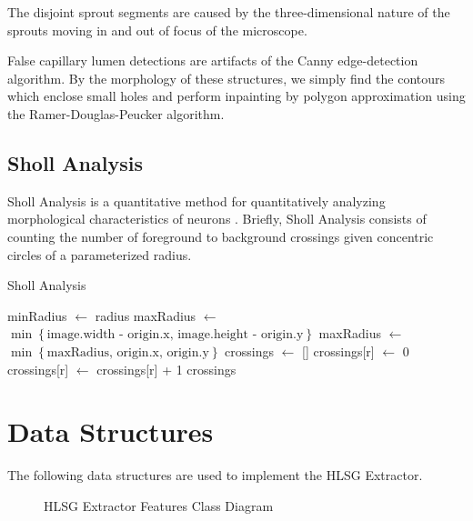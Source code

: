 \documentclass{sig-alternate}
\begin{document}
		The disjoint sprout segments are caused by the three-dimensional nature
		of the sprouts moving in and out of focus of the microscope.
		
		False capillary lumen detections are artifacts of the Canny
		edge-detection algorithm. By the morphology of these structures, we
		simply find the contours which enclose small holes and perform
		inpainting by polygon approximation using the Ramer-Douglas-Peucker
		algorithm.

	\subsection{Sholl Analysis} %
	\label{sub:Sholl Analysis}
		Sholl Analysis is a quantitative method for quantitatively analyzing
		morphological characteristics of neurons \cite{sholl53}. Briefly, Sholl
		Analysis consists of counting the number of foreground to background
		crossings given concentric circles of a parameterized radius.

		\begin{algorithm}[ht!]
			\caption{Sholl Analysis}
			\begin{algorithmic}
					\State minRadius $\gets$ radius
					\State maxRadius $\gets$ $\min\left\{\text{image.width - origin.x, image.height - origin.y}\right\}$
					\State maxRadius $\gets$ $\min\left\{\text{maxRadius, origin.x, origin.y}\right\}$
					\State crossings $\gets$ []
						\State crossings[r] $\gets$ 0
								\State crossings[r] $\gets$ crossings[r] + 1
							\EndIf
						\EndFor
					\EndFor
					\State \Return crossings
				\EndProcedure
			\end{algorithmic}
		\end{algorithm}

\section{Data Structures} %
\label{sec:Data Structures}
	The following data structures are used to implement the HLSG Extractor.
	\begin{figure}[!ht]
		\centering
		
		\caption{HLSG Extractor Features Class Diagram}
		\label{fig:classdiag}
	\end{figure}
\end{document}
